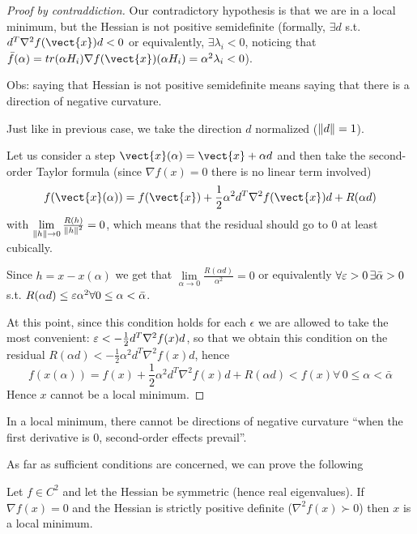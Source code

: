 \documentclass[computationalMathematics.tex]{subfiles}
\begin{document}
\begin{proof}[Proof by contraddiction]
  Our contradictory hypothesis is that we are in a local minimum, but the Hessian is not positive semidefinite (formally, $\exists d$ s.t.~$d^T \nabla^2 f(\vect{x}) d < 0$ or equivalently, $\exists \lambda_i <0$, noticing that $\bar{f}(\alpha)  = tr{(\alpha H_i)} \nabla f(\vect{x}) (\alpha H_i) = \alpha^2 \lambda_i < 0$).
  
  Obs: saying that Hessian is not positive semidefinite means saying that there is a direction of negative curvature.

  Just like in previous case, we take the direction $d$ normalized ($\left\lVert d\right\rVert = 1$).

  Let us consider a step $\vect{x}(\alpha) = \vect{x}+ \alpha d$ and then take the second-order Taylor formula (since $\nabla f(x) = 0$ there is no linear term involved)
\[
  f(\vect{x}(\alpha)) = f(\vect{x}) + \frac{1}{2} \alpha^2 d^T \nabla^2 f(\vect{x}) d + R( \alpha d )
\]
with $\lim\limits_{\left\lVert h\right\rVert \to 0} \frac{R(h)}{\left\lVert h\right\rVert^2} = 0$, which means that the residual should go to $0$ at least cubically.
  
Since $h = x - x(\alpha)$ we get that $\lim\limits_{\alpha \to 0} \frac{R(\alpha d)}{\alpha^2} = 0$ or equivalently $\forall \varepsilon > 0 \, \exists \bar{\alpha} > 0$ s.t. $R(\alpha d) \leq \varepsilon \alpha^2 \forall 0 \leq \alpha < \bar{\alpha}$.

At this point, since this condition holds for each $\epsilon$ we are allowed to take the most convenient: $\varepsilon < -\frac{1}{2} d^T \nabla^2 f(x) d$, so that we obtain this condition on the residual $R(\alpha d) < -\frac{1}{2} \alpha^2 d^T \nabla^2 f(x) d$, hence
\[
f(x(\alpha)) = f(x) + \frac{1}{2} \alpha^2 d^T \nabla^2 f(x) d + R(\alpha d) < f(x) \forall \, 0 \leq \alpha < \bar{\alpha}
\]
Hence $x$ cannot be a local minimum.
\end{proof}


  In a local minimum, there cannot be directions of  negative curvature ``when the first derivative is $0$, second-order effects prevail''.

As far as sufficient conditions are concerned, we can prove the following

\begin{proposition}
  Let $f \in C^2$ and let the Hessian be symmetric (hence real eigenvalues).
  If $\nabla f(x) = 0$ and the Hessian is strictly positive definite ($\nabla^2 f(x) \succ 0$) then $x$ is a local minimum.
\end{proposition}
\end{document}
